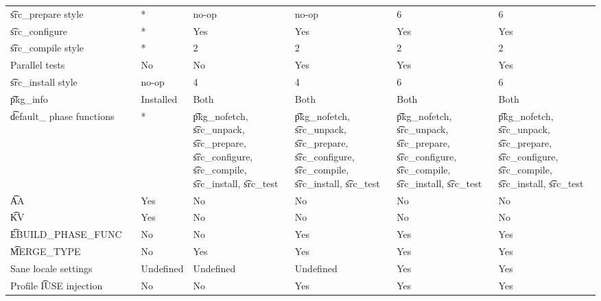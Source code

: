\begin{landscape}
\begin{longtable}{llP{7.5em}P{7.5em}P{7.5em}P{7.5em}P{7.5em}}
\t{src_prepare} style &  &
    * & no-op & no-op & 6 & 6 \\

\t{src_configure} &  &
    * & Yes & Yes & Yes & Yes \\

\t{src_compile} style &  &
    * & 2 & 2 & 2 & 2 \\

Parallel tests &  &
    No & No & Yes & Yes & Yes \\

\t{src_install} style &  &
    no-op & 4 & 4 & 6 & 6 \\

\t{pkg_info} &  &
    Installed & Both & Both & Both & Both \\

\t{default_} phase functions &  &
    * &
    \t{pkg_nofetch}, \t{src_unpack}, \t{src_prepare}, \t{src_configure},
        \t{src_compile}, \t{src_install}, \t{src_test} &
    \t{pkg_nofetch}, \t{src_unpack}, \t{src_prepare}, \t{src_configure},
        \t{src_compile}, \t{src_install}, \t{src_test} &
    \t{pkg_nofetch}, \t{src_unpack}, \t{src_prepare}, \t{src_configure},
        \t{src_compile}, \t{src_install}, \t{src_test} &
    \t{pkg_nofetch}, \t{src_unpack}, \t{src_prepare}, \t{src_configure},
        \t{src_compile}, \t{src_install}, \t{src_test} \\

\t{AA} &  &
    Yes & No & No & No & No \\

\t{KV} &  &
    Yes & No & No & No & No \\

\t{EBUILD_PHASE_FUNC} &  &
    No & No & Yes & Yes & Yes \\

\t{MERGE_TYPE} &  &
    No & Yes & Yes & Yes & Yes \\

Sane locale settings &  &
    Undefined & Undefined & Undefined & Yes & Yes \\

Profile \t{IUSE} injection &  &
    No & No & Yes & Yes & Yes \\


\end{longtable}
\end{landscape}
